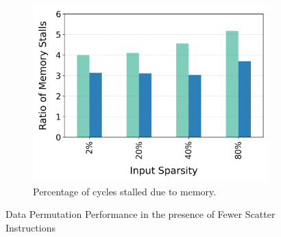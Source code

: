 \begin{figure}[t]
\begin{subfigure}{.499\textwidth}
        \centering
    \includegraphics[width=\textwidth]{Figures/Evaluations/if_then_else_few_scatter_mem_stalls.png}
    \caption{Percentage of cycles stalled due to memory.}
    \label{fig:if-then-else-few-scatter-mem-stalls}
  \end{subfigure}
  
  \caption{Data Permutation Performance in the presence of Fewer Scatter Instructions}
  \label{fig:if-then-else-few-scatter}
\end{figure}

